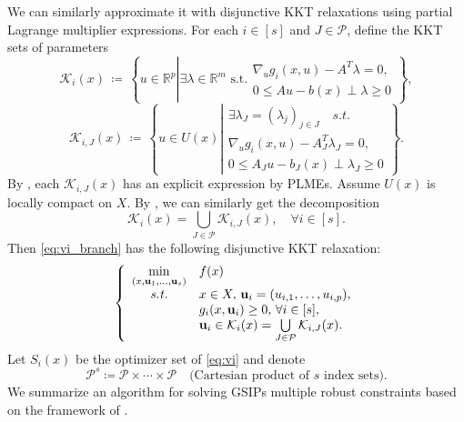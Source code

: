\documentclass{amsart}
\theoremstyle{plain}
\newcommand{\re}{\mathbb{R}}
\newcommand{\st}{\mathit{s.t.}}
\newcommand{\mc}[1]{\mathcal{#1}}
\numberwithin{equation}{section}
\begin{document}
		We can similarly approximate it with disjunctive KKT relaxations using partial Lagrange 
        multiplier expressions.
		For each $i\in [s]$ and $J\in\mc{P}$, define the KKT sets of parameters 
		\begin{equation}\label{eq:Ki(x)}
				\mc{K}_i(x)\,\coloneqq\,\left\{ u\in\re^p \left|
			\exists \lambda\in\re^m\,\,\mbox{s.t.}
			\begin{array}{l}
				\nabla_u g_i(x,u) - A^T\lambda = 0,\\
				0\le Au-b(x)\perp \lambda\ge 0
			\end{array}
			\right.\right\},
		\end{equation}
		\begin{equation}\label{eq:K_Ji(x)}
				\mc{K}_{i,J}(x) \,\coloneqq\, \left\{ u\in U(x)\left|
				\begin{array}{l}
					\mbox{$\exists\lambda_{J} = (\lambda_j)_{j\in J}$}\quad\st\\
					\nabla_u g_i(x,u) - A_J^T\lambda_J = 0,\\
					0\le A_Ju-b_J(x)\perp \lambda_J\ge 0
				\end{array}\right.\right\}.
		\end{equation}
		By , each $\mc{K}_{i,J}(x)$ has an explicit expression by PLMEs.
		Assume $U(x)$ is locally compact on $X$.
		By , we can similarly get the decomposition
		\[\mc{K}_i(x) = \bigcup\limits_{J\in\mc{P}}\mc{K}_{i,J}(x),\quad \forall i\in[s].\]
		Then \eqref{eq:vi_branch} has the following disjunctive KKT relaxation:
		\begin{equation}\label{eq:kktrel_multi}
		\left\{\begin{array}{cl}
			\min\limits_{(x,{\bf u}_1,\ldots, {\bf u}_s)} & f(x)\\
			\st  & x\in X,\, {\bf u}_i = (u_{i,1},\ldots, u_{i,p}),\\
			& g_i(x,{\bf u}_i)\ge 0,\,\forall i\in[s],\\
			& {\bf u}_i\in \mc{K}_i(x) = \bigcup\limits_{J\in\mc{P}}\mc{K}_{i,J}(x).\\
		\end{array}
		\right.
		\end{equation}
		Let $S_i(x)$ be the optimizer set of \eqref{eq:vi} and denote
		\[
		\mc{P}^s \coloneqq \mc{P}\times \cdots \times \mc{P}\quad 
		\mbox{(Cartesian product of $s$ index sets)}.
		\]
        We summarize an algorithm for solving GSIPs multiple robust constraints
        based on the framework of .
\end{document}
